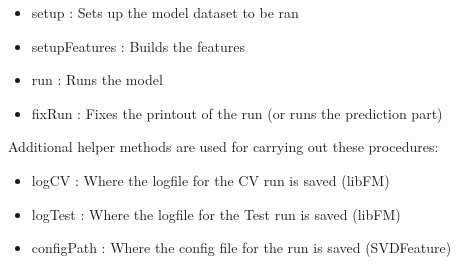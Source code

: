 \documentclass{article}
\begin{document}
\begin{itemize}
\item
  setup : Sets up the model dataset to be ran
\item
  setupFeatures : Builds the features
\item
  run : Runs the model
\item
  fixRun : Fixes the printout of the run (or runs the prediction part)
\end{itemize}

Additional helper methods are used for carrying out these procedures:

\begin{itemize}
\item logCV : Where the logfile for the CV run is saved (libFM) 
\item logTest : Where the logfile for the Test run is saved (libFM) 
\item configPath : Where the config file for the run is saved (SVDFeature)
\end{itemize}
\end{document}
